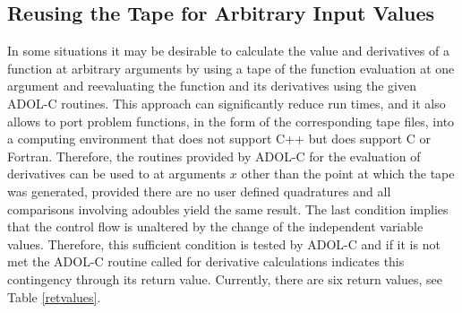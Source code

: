 \documentclass[11pt,twoside]{article}
\begin{document}
\subsection{Reusing the Tape for Arbitrary Input Values}
\label{reuse_tape}
%
In some situations it may be desirable to calculate the value and
derivatives of a function at arbitrary arguments by using a tape of
the function evaluation at one argument and reevaluating the
function  and its derivatives using the given ADOL-C
routines. This approach can
significantly reduce run times, and it 
also allows to port problem functions, in the form of the  
corresponding tape files, into a computing environment that
does not support C++ but does support C or Fortran.  
Therefore, the routines provided by ADOL-C for the evaluation of derivatives
can be used to at arguments $x$ other than the
point at which the tape was generated, provided there are
no user defined quadratures and all comparisons involving
{\sf adouble}s yield the same result. The last condition 
implies that the control flow is unaltered by the change
of the independent variable values. Therefore, this sufficient
condition is tested by ADOL-C and if it is not met 
the ADOL-C routine called for derivative calculations indicates this
contingency through its return value. Currently, there are six return values,
see Table \ref{retvalues}. 
\end{document}
